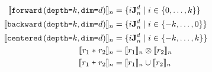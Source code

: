 \begin{align*}
%
%
\interp{\stenFwd{k}{d}}_n & =
 \{i\singleEntry{d}{n} \mid i \in \{0, \ldots, k\} \} \\
\interp{\stenBwd{k}{d}}_n & =
 \{i\singleEntry{d}{n} \mid i \in \{-k, \ldots, 0\} \} \\
\interp{\stenCen{k}{d}}_n & =
 \{i\singleEntry{d}{n} \mid i \in \{-k, \ldots, k\} \} \\
%
%
\interp{r_1 \; \texttt{$\ast$} \; r_2}_n &
= \interp{r_1}_n \otimes \interp{r_2}_n \\
%
%
\interp{r_1 \; \texttt{+} \; r_2}_n &
= \interp{r_1}_n \cup \interp{r_2}_n
\end{align*}
